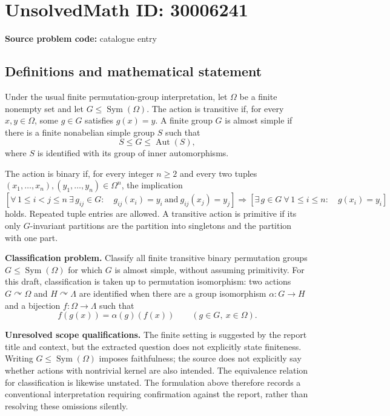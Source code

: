 \documentclass[11pt]{article}
\begin{document}
\section*{UnsolvedMath ID: 30006241}
\textbf{Source problem code:} catalogue entry
\subsection{Definitions and mathematical statement}
Under the usual finite permutation-group interpretation, let \(\Omega\) be a finite nonempty set and let \(G\leq\operatorname{Sym}(\Omega)\). The action is transitive if, for every \(x,y\in\Omega\), some \(g\in G\) satisfies \(g(x)=y\). A finite group \(G\) is almost simple if there is a finite nonabelian simple group \(S\) such that
\[
S\leq G\leq\operatorname{Aut}(S),
\]
where \(S\) is identified with its group of inner automorphisms.

The action is binary if, for every integer \(n\geq2\) and every two tuples \((x_1,\ldots,x_n),(y_1,\ldots,y_n)\in\Omega^n\), the implication
\[
\left[\forall\,1\leq i<j\leq n\ \exists\,g_{ij}\in G:\quad g_{ij}(x_i)=y_i\ \text{and}\ g_{ij}(x_j)=y_j\right]
\Longrightarrow
\left[\exists\,g\in G\ \forall\,1\leq i\leq n:\quad g(x_i)=y_i\right]
\]
holds. Repeated tuple entries are allowed. A transitive action is primitive if its only \(G\)-invariant partitions are the partition into singletons and the partition with one part.

\textbf{Classification problem.} Classify all finite transitive binary permutation groups \(G\leq\operatorname{Sym}(\Omega)\) for which \(G\) is almost simple, without assuming primitivity. For this draft, classification is taken up to permutation isomorphism: two actions \(G\curvearrowright\Omega\) and \(H\curvearrowright\Lambda\) are identified when there are a group isomorphism \(\alpha:G\to H\) and a bijection \(f:\Omega\to\Lambda\) such that
\[
f(g(x))=\alpha(g)(f(x))\qquad(g\in G,\ x\in\Omega).
\]

\textbf{Unresolved scope qualifications.} The finite setting is suggested by the report title and context, but the extracted question does not explicitly state finiteness. Writing \(G\leq\operatorname{Sym}(\Omega)\) imposes faithfulness; the source does not explicitly say whether actions with nontrivial kernel are also intended. The equivalence relation for classification is likewise unstated. The formulation above therefore records a conventional interpretation requiring confirmation against the report, rather than resolving these omissions silently.
\end{document}
